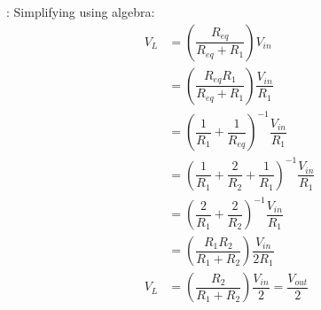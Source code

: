 \documentclass[handout]{beamer}
\begin{document}
\begin{frame}{\secname : \subsecname}
    Simplifying using algebra:
    \begin{align}
        V_{L} &= \left( \dfrac{R_{eq}}{R_{eq}+R_1} \right) V_{in} \\
                &= \left( \dfrac{R_{eq} R_1}{R_{eq}+R_1} \right) \dfrac{V_{in}}{R_1} \\
                &= \left( \dfrac{1}{R_1} + \dfrac{1}{R_{eq}} \right)^{-1} \dfrac{V_{in}}{R_1} \\ 
                &= \left( \dfrac{1}{R_1} + \dfrac{2}{R_{2}}+\dfrac{1}{R_{1}} \right)^{-1} \dfrac{V_{in}}{R_1} \\
                &= \left( \dfrac{2}{R_1} + \dfrac{2}{R_{2}} \right)^{-1} \dfrac{V_{in}}{R_1} \\
                &= \left( \dfrac{R_1 R_2}{R_1+R_2} \right) \dfrac{V_{in}}{2 R_1} \\
            V_L &= \left( \dfrac{R_2}{R_1+R_2} \right) \dfrac{V_{in}}{2} = \dfrac{V_{out}}{2}
    \end{align}
\end{frame}
\end{document}
